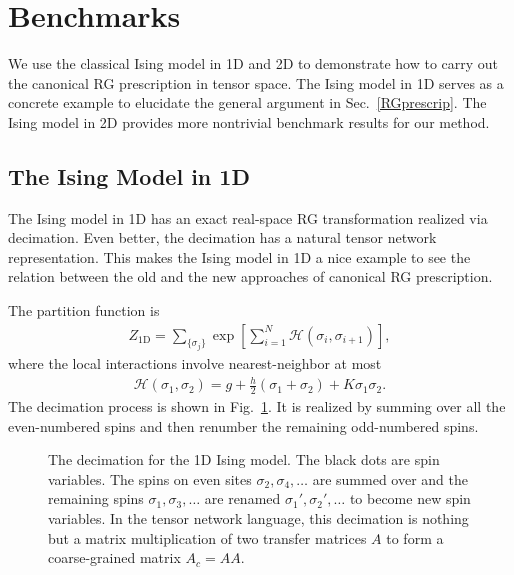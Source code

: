 \documentclass[aps,prb,reprint,superscriptaddress,floatfix]{revtex4-2}
\begin{document}
\section{Benchmarks\label{benchmark}}
We use the classical Ising model in 1D and 2D to demonstrate how to carry out the canonical RG prescription in tensor space. 
The Ising model in 1D serves as a concrete example to elucidate the general argument in Sec.~\ref{RGprescrip}. 
The Ising model in 2D provides more nontrivial benchmark results for our method.
%

\subsection{The Ising Model in 1D\label{benchmark:1DIsing}}
The Ising model in 1D has an exact real-space RG transformation realized via decimation. 
Even better, the decimation has a natural tensor network representation. 
This makes the Ising model in 1D a nice example to see the relation between the old and the new approaches of canonical RG prescription.
%

The partition function is
%
\begin{align}\label{def:Z4Ising1D}
    Z_{\text{1D}} = \sum_{\{\sigma_j \} } \exp{\left[\sum_{i=1}^N
    \mathscr{H}\left(\sigma_i,\sigma_{i+1}\right)  \right]},
\end{align}
%
where the local interactions involve nearest-neighbor at most
%
\begin{align}\label{def:H4Ising1D}
    \mathscr{H}\left(\sigma_1, \sigma_2\right) = g +
    \frac{h}{2}\left(\sigma_1 + \sigma_2\right) + K\sigma_1 \sigma_2.
\end{align}
%
The decimation process is shown in Fig.~\ref{fig:Ising1D-decimation}.
It is realized by summing over all the even-numbered spins and then
renumber the remaining odd-numbered spins. 
%
\begin{figure}[h]
    \caption{\label{fig:Ising1D-decimation}
        The decimation for the 1D Ising model. 
        The black dots are spin variables. 
        The spins on even sites $\sigma_2,\sigma_4,\ldots$ are summed over and the remaining spins $\sigma_1,\sigma_3,\ldots$ are renamed $\sigma_1',\sigma_2',\ldots$ to become new spin variables. 
        In the tensor network language, this decimation is nothing but a matrix multiplication of two transfer matrices $A$ to form a coarse-grained matrix $A_c = AA$.
    }
\end{figure}
%
\end{document}
